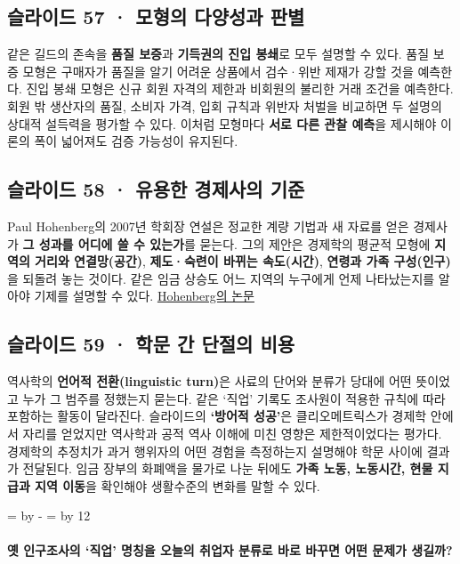 \documentclass[10pt,a4paper]{article}
\newcommand{\ReserveQuestionSpace}{%
  \par\begingroup
  \dimen0=\pagegoal \advance\dimen0 by -\pagetotal
  \dimen2=\baselineskip \multiply\dimen2 by 12
  \ifdim\dimen0<\dimen2 \newpage\fi
  \endgroup}
\begin{document}
\subsection{슬라이드 57 · 모형의 다양성과 판별}
같은 길드의 존속을 \textbf{품질 보증}과 \textbf{기득권의 진입 봉쇄}로 모두 설명할 수 있다. 품질 보증 모형은 구매자가 품질을 알기 어려운 상품에서 검수·위반 제재가 강할 것을 예측한다. 진입 봉쇄 모형은 신규 회원 자격의 제한과 비회원의 불리한 거래 조건을 예측한다. 회원 밖 생산자의 품질, 소비자 가격, 입회 규칙과 위반자 처벌을 비교하면 두 설명의 상대적 설득력을 평가할 수 있다. 이처럼 모형마다 \textbf{서로 다른 관찰 예측}을 제시해야 이론의 폭이 넓어져도 검증 가능성이 유지된다.\par

\subsection{슬라이드 58 · 유용한 경제사의 기준}
Paul Hohenberg의 2007년 학회장 연설은 정교한 계량 기법과 새 자료를 얻은 경제사가 \textbf{그 성과를 어디에 쓸 수 있는가}를 묻는다. 그의 제안은 경제학의 평균적 모형에 \textbf{지역의 거리와 연결망(공간)}, \textbf{제도·숙련이 바뀌는 속도(시간)}, \textbf{연령과 가족 구성(인구)}을 되돌려 놓는 것이다. 같은 임금 상승도 어느 지역의 누구에게 언제 나타났는지를 알아야 기제를 설명할 수 있다. \href{https://www.cambridge.org/core/journals/journal-of-economic-history/article/abs/toward-a-more-useful-economic-history/3D2A2F355A48BB696645B287792223A9}{Hohenberg의 논문}\par

\subsection{슬라이드 59 · 학문 간 단절의 비용}
역사학의 \textbf{언어적 전환(linguistic turn)}은 사료의 단어와 분류가 당대에 어떤 뜻이었고 누가 그 범주를 정했는지 묻는다. 같은 ‘직업’ 기록도 조사원이 적용한 규칙에 따라 포함하는 활동이 달라진다. 슬라이드의 \textbf{‘방어적 성공’}은 클리오메트릭스가 경제학 안에서 자리를 얻었지만 역사학과 공적 역사 이해에 미친 영향은 제한적이었다는 평가다. 경제학의 추정치가 과거 행위자의 어떤 경험을 측정하는지 설명해야 학문 사이에 결과가 전달된다. 임금 장부의 화폐액을 물가로 나눈 뒤에도 \textbf{가족 노동, 노동시간, 현물 지급과 지역 이동}을 확인해야 생활수준의 변화를 말할 수 있다.\par

\ReserveQuestionSpace
\paragraph{옛 인구조사의 ‘직업’ 명칭을 오늘의 취업자 분류로 바로 바꾸면 어떤 문제가 생길까?}
\end{document}
